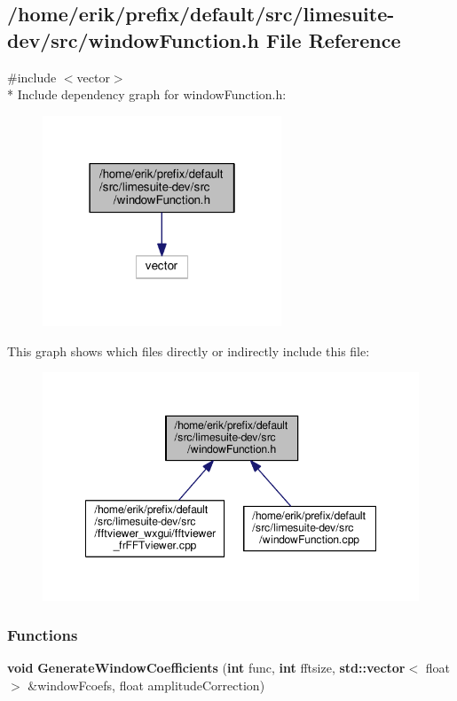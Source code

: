\subsection{/home/erik/prefix/default/src/limesuite-\/dev/src/window\+Function.h File Reference}
\label{windowFunction_8h}
{\ttfamily \#include $<$vector$>$}\\*
Include dependency graph for window\+Function.\+h\+:
\nopagebreak
\begin{figure}[H]
\begin{center}
\leavevmode
\includegraphics[width=202pt]{d5/df8/windowFunction_8h__incl}
\end{center}
\end{figure}
This graph shows which files directly or indirectly include this file\+:
\nopagebreak
\begin{figure}[H]
\begin{center}
\leavevmode
\includegraphics[width=348pt]{d2/d1c/windowFunction_8h__dep__incl}
\end{center}
\end{figure}
\subsubsection*{Functions}
\begin{DoxyCompactItemize}
\item 
{\bf void} {\bf Generate\+Window\+Coefficients} ({\bf int} func, {\bf int} fftsize, {\bf std\+::vector}$<$ float $>$ \&window\+Fcoefs, float amplitude\+Correction)
\end{DoxyCompactItemize}


